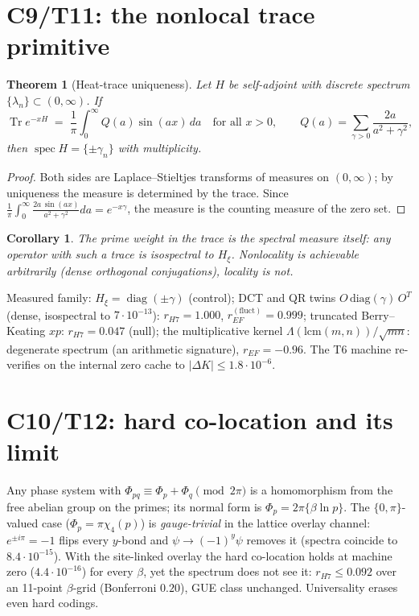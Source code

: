 \documentclass[11pt]{article}
\newtheorem{theorem}{Theorem}
\newtheorem{corollary}{Corollary}
\theoremstyle{definition}
\begin{document}
\section{C9/T11: the nonlocal trace primitive}
\begin{theorem}[Heat-trace uniqueness]
Let $H$ be self-adjoint with discrete spectrum $\{\lambda_n\} \subset
(0,\infty)$. If
\[
\operatorname{Tr} e^{-xH} \;=\; \frac{1}{\pi}\int_0^\infty Q(a)\sin(ax)\,
da \quad \text{for all } x>0,
\qquad Q(a) = \sum_{\gamma>0} \frac{2a}{a^2+\gamma^2},
\]
then $\operatorname{spec} H = \{\pm\gamma_n\}$ with multiplicity.
\end{theorem}
\begin{proof}
Both sides are Laplace--Stieltjes transforms of measures on $(0,\infty)$;
by uniqueness the measure is determined by the trace. Since
$\frac{1}{\pi}\int_0^\infty \frac{2a\,\sin(ax)}{a^2+\gamma^2}da =
e^{-x\gamma}$, the measure is the counting measure of the zero set.
\end{proof}
\begin{corollary}
The prime weight in the trace is the spectral measure itself: any operator
with such a trace is isospectral to $H_\xi$. Nonlocality is achievable
arbitrarily (dense orthogonal conjugations), locality is not.
\end{corollary}

Measured family: $H_\xi = \operatorname{diag}(\pm\gamma)$ (control); DCT
and QR twins $O\,\mathrm{diag}(\gamma)\,O^T$ (dense, isospectral to
$7\cdot10^{-13}$): $r_{H7} = 1.000$, $r_{EF}^{(\mathrm{fluct})} = 0.999$;
truncated Berry--Keating $xp$: $r_{H7}=0.047$ (null); the multiplicative
kernel $\Lambda(\mathrm{lcm}(m,n))/\sqrt{mn}$: degenerate spectrum (an
arithmetic signature), $r_{EF}=-0.96$. The T6 machine re-verifies on the
internal zero cache to $|\Delta K| \le 1.8\cdot10^{-6}$.

\section{C10/T12: hard co-location and its limit}
Any phase system with $\Phi_{pq} \equiv \Phi_p + \Phi_q \pmod{2\pi}$ is a
homomorphism from the free abelian group on the primes; its normal form is
$\Phi_p = 2\pi\{\beta \ln p\}$. The $\{0,\pi\}$-valued case
($\Phi_p = \pi\chi_4(p)$) is \emph{gauge-trivial} in the lattice overlay
channel: $e^{\pm i\pi} = -1$ flips every $y$-bond and $\psi \to
(-1)^y\psi$ removes it (spectra coincide to $8.4\cdot10^{-15}$). With the
site-linked overlay the hard co-location holds at machine zero
($4.4\cdot10^{-16}$) for every $\beta$, yet the spectrum does not see it:
$r_{H7} \le 0.092$ over an 11-point $\beta$-grid (Bonferroni $0.20$), GUE
class unchanged. Universality erases even hard codings.
\end{document}
